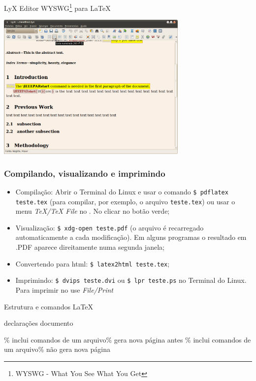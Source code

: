 \begin{frame}{LyX}
Editor WYSWG\footnote{WYSWG - What You See What You Get} para LaTeX %
\begin{center}
\includegraphics[width=0.70\textwidth]{img/LyX.png}
\end{center}
\end{frame}

\begin{frame}[fragile] %
\frametitle{Compilando, visualizando e imprimindo}
\begin{itemize}
\item Compilação: Abrir o Terminal do Linux e usar o comando \verb+$ pdflatex teste.tex+ (para compilar, por exemplo, o arquivo \verb+teste.tex+) ou usar o menu \emph{TeX/TeX File} no . No  clicar no botão verde;
\item Visualização: \verb+$ xdg-open teste.pdf+ (o arquivo é recarregado automaticamente a cada modificação). Em alguns programas o resultado em .PDF aparece direitamente numa segunda janela;
\item Convertendo para html: \verb+$ latex2html teste.tex+;
\item Imprimindo: \verb+$ dvips teste.dvi+ ou \verb+$ lpr teste.ps+ no Terminal do Linux. Para imprimir no  use \emph{File/Print}
\end{itemize}
\end{frame}

\begin{frame}{Estrutura e comandos \LaTeX}
\begin{LaTeXcode}
\n
declarações\n
{}\n
documento\n
{}
\end{LaTeXcode}

\medskip

\begin{LaTeXcode}
\% inclui comandos de um arquivo\n \% gera nova página antes\nn
{} 
\% inclui comandos de um arquivo\n \% não gera nova página
\end{LaTeXcode}
\end{frame}

